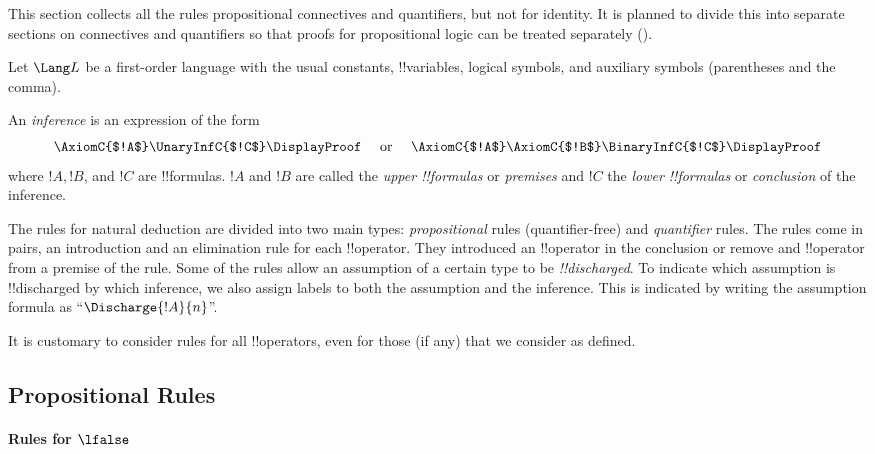 \documentclass[../../../include/open-logic-section]{subfiles}
\begin{document}


\begin{editorial}
  This section collects all the rules propositional connectives and
  quantifiers, but not for identity.  It is planned to divide this
  into separate sections on connectives and quantifiers so that proofs
  for propositional logic can be treated separately
  ().
\end{editorial}

Let $\Lang L$ be a first-order language with the usual constants,
!!{variable}s, logical symbols, and auxiliary symbols (parentheses
and the comma).

\begin{defn}[Inference]
An \emph{inference} is an expression of the form
\[
\AxiomC{$!A$}
\UnaryInfC{$!C$}
\DisplayProof
\quad
\textrm{  or  }
\quad
\AxiomC{$!A$}
\AxiomC{$!B$}
\BinaryInfC{$!C$}
\DisplayProof
\]
where $!A, !B$, and $!C$ are !!{formula}s. $!A$ and $!B$ are called
the \emph{upper !!{formula}s} or \emph{premises} and $!C$ the
\emph{lower !!{formula}s} or \emph{conclusion} of the inference.
\end{defn}

The rules for natural deduction are divided into two main types:
\emph{propositional} rules (quantifier-free) and \emph{quantifier}
rules.  The rules come in pairs, an introduction and an elimination
rule for each !!{operator}. They introduced an !!{operator} in the
conclusion or remove and !!{operator} from a premise of the rule.
Some of the rules allow an assumption of a certain type to be
\emph{!!{discharged}}. To indicate which assumption is !!{discharged}
by which inference, we also assign labels to both the assumption and
the inference.  This is indicated by writing the assumption formula as
``$\Discharge{!A}{n}$''.

It is customary to consider rules for all !!{operator}s, even for
those (if any) that we consider as defined.

\subsection{Propositional Rules}

\paragraph{Rules for $\lfalse$}
\end{document}
